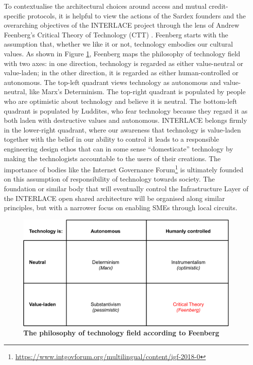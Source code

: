 To contextualise the architectural choices around access and mutual credit-specific protocols, it is helpful to view the actions of the Sardex founders and the overarching objectives of the INTERLACE project through the lens of Andrew Feenberg's Critical Theory of Technology (CTT) \cite{Feenberg1999}. Feenberg starts with the assumption that, whether we like it or not, technology embodies our cultural values. As shown in Figure \ref{fig:Feenberg}, Feenberg maps the philosophy of technology field with two axes: in one direction, technology is regarded as either value-neutral or value-laden; in the other direction, it is regarded as either human-controlled or autonomous. The top-left quadrant views technology as autonomous and value-neutral, like Marx's Determinism. The top-right quadrant is populated by people who are optimistic about technology and believe it is neutral. The bottom-left quadrant is populated by Luddites, who fear technology because they regard it as both laden with destructive values and autonomous. INTERLACE belongs firmly in the lower-right quadrant, where our awareness that technology is value-laden together with the belief in our ability to control it leads to a responsible engineering design ethos that can in some sense ``domesticate'' technology by making the technologists accountable to the users of their creations. The importance of bodies like the Internet Governance Forum\footnote{\url{https://www.intgovforum.org/multilingual/content/igf-2018-0}} is ultimately founded on this assumption of responsibility of technology towards society. The foundation or similar body that will eventually control the Infrastructure Layer of the INTERLACE open shared architecture will be organised along similar principles, but with a narrower focus on enabling SMEs through local circuits.

\begin{figure}[h]
\centering
\includegraphics[width=12 cm]{Figures/Feenberg}
\caption{\bf \small The philosophy of technology field according to Feenberg \cite{Feenberg1999}}
\label{fig:Feenberg}
\end{figure}



